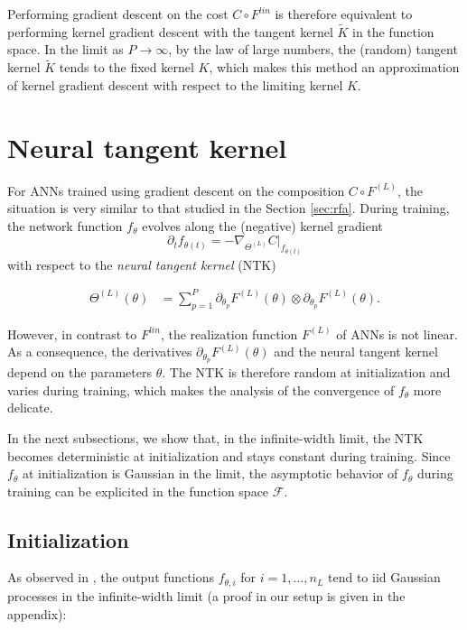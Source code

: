 Performing gradient descent on the cost $ C \circ F^{lin}$ is therefore equivalent to performing kernel gradient descent with the tangent kernel $\tilde{K}$ in the function space. In the limit as $P \to \infty$, by the law of large numbers, the (random) tangent kernel $\tilde{K}$ tends to the fixed kernel $K$, which makes this method an approximation of kernel gradient descent with respect to the limiting kernel $K$.

\section{Neural tangent kernel} \label{sec:neural_tangent_kernel}
For ANNs trained using gradient descent on the composition $C \circ F^{(L)}$, the situation is very similar to that studied in the Section \ref{sec:rfa}. During training, the network function $f_\theta$ evolves along the (negative) kernel gradient $$
\partial_t  f_{\theta(t)} = -\nabla_{\Theta^{(L)}} C|_{f_{\theta(t)}}
$$
with respect to the \emph{neural tangent kernel} (NTK)

\begin{align*}
 \Theta^{(L)}(\theta) &= \sum_{p=1}^P \partial_{\theta_p} F^{(L)}(\theta) \otimes \partial_{\theta_p} F^{(L)}(\theta).
\end{align*}

However, in contrast to $F^{lin}$, the realization function $F^{(L)}$ of ANNs is not linear. As a consequence, the derivatives $\partial_{\theta_p} F^{(L)}(\theta)$ and the neural tangent kernel depend on the parameters $\theta$. The NTK is therefore random at initialization and varies during training, which makes the analysis of the convergence of $f_\theta$ more delicate.

In the next subsections, we show that, in the infinite-width limit, the NTK becomes deterministic at initialization and stays constant during training. Since $f_\theta$ at initialization is Gaussian in the limit, the asymptotic behavior of $f_\theta$ during training can be explicited in the function space $ \mathcal{F} $.

\subsection{Initialization}
As observed in \cite{Neal1996,Daniely, Matthews2017GaussianProcess,Lee2017,Matthews2018GaussianProcess}, the output functions $f_{\theta, i}$ for $i=1, ..., n_L$ tend to iid Gaussian processes in the infinite-width limit (a proof in our setup is given in the appendix):

